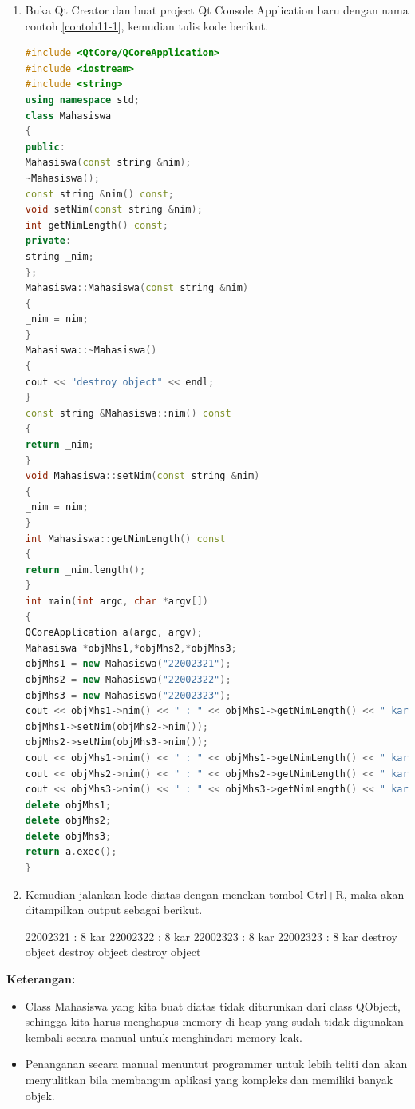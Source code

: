 \begin{enumerate}

\item
  Buka Qt Creator dan buat project Qt Console Application baru dengan
  nama contoh \ref{contoh11-1}, kemudian tulis kode berikut.

\begin{lstlisting}[language=c++, caption= Alokasi memory dinamis tanpa QObject, label=contoh11-1]
#include <QtCore/QCoreApplication>
#include <iostream>
#include <string>
using namespace std;
class Mahasiswa
{
public:
Mahasiswa(const string &nim);
~Mahasiswa();
const string &nim() const;
void setNim(const string &nim);
int getNimLength() const;
private:
string _nim;
};
Mahasiswa::Mahasiswa(const string &nim)
{
_nim = nim;
}
Mahasiswa::~Mahasiswa()
{
cout << "destroy object" << endl;
}
const string &Mahasiswa::nim() const
{
return _nim;
}
void Mahasiswa::setNim(const string &nim)
{
_nim = nim;
}
int Mahasiswa::getNimLength() const
{
return _nim.length();
}
int main(int argc, char *argv[])
{
QCoreApplication a(argc, argv);
Mahasiswa *objMhs1,*objMhs2,*objMhs3;
objMhs1 = new Mahasiswa("22002321");
objMhs2 = new Mahasiswa("22002322");
objMhs3 = new Mahasiswa("22002323");
cout << objMhs1->nim() << " : " << objMhs1->getNimLength() << " kar" << endl;
objMhs1->setNim(objMhs2->nim());
objMhs2->setNim(objMhs3->nim());
cout << objMhs1->nim() << " : " << objMhs1->getNimLength() << " kar" << endl;
cout << objMhs2->nim() << " : " << objMhs2->getNimLength() << " kar" << endl;
cout << objMhs3->nim() << " : " << objMhs3->getNimLength() << " kar" << endl;
delete objMhs1;
delete objMhs2;
delete objMhs3;
return a.exec();
}
\end{lstlisting}
\item
  Kemudian jalankan kode diatas dengan menekan tombol Ctrl+R, maka akan
  ditampilkan output sebagai berikut.
  
\begin{lcverbatim}
22002321 : 8 kar
22002322 : 8 kar
22002323 : 8 kar
22002323 : 8 kar
destroy object
destroy object
destroy object
\end{lcverbatim}
\end{enumerate}

\textbf{Keterangan:}

\begin{itemize}

\item
  Class Mahasiswa yang kita buat diatas tidak diturunkan dari class
  QObject, sehingga kita harus menghapus memory di heap yang sudah tidak
  digunakan kembali secara manual untuk menghindari memory leak.
\item
  Penanganan secara manual menuntut programmer untuk lebih teliti dan
  akan menyulitkan bila membangun aplikasi yang kompleks dan memiliki
  banyak objek.
\end{itemize}

